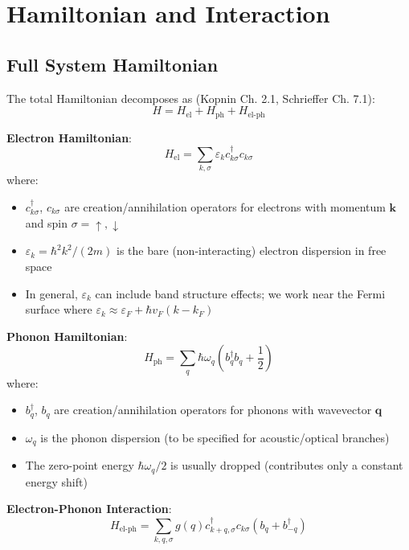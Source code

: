 \documentclass[12pt]{article}
\begin{document}
\section{Hamiltonian and Interaction}

\subsection{Full System Hamiltonian}

The total Hamiltonian decomposes as (Kopnin Ch. 2.1, Schrieffer Ch. 7.1):
\begin{equation}
\boxed{
H = H_{\text{el}} + H_{\text{ph}} + H_{\text{el-ph}}
}
\end{equation}

\textbf{Electron Hamiltonian}:
\begin{equation}
H_{\text{el}} = \sum_{k,\sigma} \varepsilon_k c^\dagger_{k\sigma} c_{k\sigma}
\end{equation}
where:
\begin{itemize}
\item $c^\dagger_{k\sigma}$, $c_{k\sigma}$ are creation/annihilation operators for electrons with momentum $\mathbf{k}$ and spin $\sigma = \uparrow, \downarrow$
\item $\varepsilon_k = \hbar^2 k^2/(2m)$ is the bare (non-interacting) electron dispersion in free space
\item In general, $\varepsilon_k$ can include band structure effects; we work near the Fermi surface where $\varepsilon_k \approx \varepsilon_F + \hbar v_F(k - k_F)$
\end{itemize}

\textbf{Phonon Hamiltonian}:
\begin{equation}
H_{\text{ph}} = \sum_q \hbar\omega_q \left(b^\dagger_q b_q + \frac{1}{2}\right)
\end{equation}
where:
\begin{itemize}
\item $b^\dagger_q$, $b_q$ are creation/annihilation operators for phonons with wavevector $\mathbf{q}$
\item $\omega_q$ is the phonon dispersion (to be specified for acoustic/optical branches)
\item The zero-point energy $\hbar\omega_q/2$ is usually dropped (contributes only a constant energy shift)
\end{itemize}

\textbf{Electron-Phonon Interaction}:
\begin{equation}
\boxed{
H_{\text{el-ph}} = \sum_{k,q,\sigma} g(q) c^\dagger_{k+q,\sigma} c_{k\sigma} (b_q + b^\dagger_{-q})
}
\end{equation}
\end{document}

